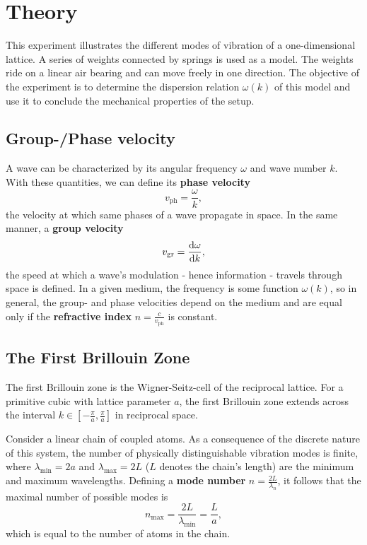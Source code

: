 \chapter{Theory}
This experiment illustrates the different modes of vibration of a one-dimensional lattice.
A series of weights connected by springs is used as a model.
The weights ride on a linear air bearing and can move freely in one direction.
The objective of the experiment is to determine the dispersion relation $\omega(k)$ of this model and use it to conclude the mechanical properties of the setup.

\section{Group-/Phase velocity}
A wave can be characterized by its angular frequency $\omega$ and wave number $k$.
With these quantities, we can define its \textbf{phase velocity}
\begin{equation*}
	v_\text{ph}=\frac{\omega}{k},
\end{equation*}
the velocity at which same phases of a wave propagate in space.
In the same manner, a \textbf{group velocity}
\begin{equation*}
	v_\text{gr}=\frac{\text{d}\omega}{\text{d} k},
\end{equation*}
the speed at which a wave's modulation - hence information - travels through space is defined.
In a given medium, the frequency is some function $\omega(k)$, so in general, the group- and phase velocities depend on the medium and are equal only if the \textbf{refractive index} $n=\frac{c}{v_\text{ph}}$ is constant.

\section{The First Brillouin Zone}
The first Brillouin zone is the Wigner-Seitz-cell of the reciprocal lattice.
For a primitive cubic with lattice parameter $a$, the first Brillouin zone extends across the interval $k\in [-\frac{\pi}{a}, \frac{\pi}{a}]$ in reciprocal space.

Consider a linear chain of coupled atoms.
As a consequence of the discrete nature of this system, the number of physically distinguishable vibration modes is finite, where $\lambda_\text{min}=2a$ and $\lambda_\text{max}=2L$ ($L$ denotes the chain's length) are the minimum and maximum wavelengths.
Defining a \textbf{mode number} $n=\frac{2L}{\lambda_n}$, it follows that the maximal number of possible modes is
\begin{equation*}
	n_\text{max}=\frac{2L}{\lambda_\text{min}}=\frac{L}{a},
\end{equation*}
which is equal to the number of atoms in the chain.

